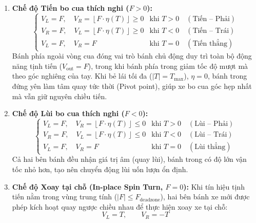 \begin{enumerate}
    \item \textbf{Chế độ Tiến bo cua thích nghi ($F > 0$):}
    \begin{equation}
    \begin{cases}
    V_L = F, \quad V_R = \left\lfloor F \cdot \eta(T) \right\rfloor \ge 0 & \text{khi } T > 0 \quad (\text{Tiến -- Phải}) \\[2mm]
    V_R = F, \quad V_L = \left\lfloor F \cdot \eta(T) \right\rfloor \ge 0 & \text{khi } T < 0 \quad (\text{Tiến -- Trái}) \\[2mm]
    V_L = F, \quad V_R = F & \text{khi } T = 0 \quad (\text{Tiến thẳng})
    \end{cases}
    \label{eq:forward_curv}
    \end{equation}
    Bánh phía ngoài vòng cua đóng vai trò bánh chủ động duy trì toàn bộ động năng tịnh tiến ($V_{\mathrm{out}} = F$), trong khi bánh phía trong giảm tốc độ mượt mà theo góc nghiêng của tay. Khi bẻ lái tối đa ($|T| = T_{\max}$), $\eta = 0$, bánh trong đứng yên làm tâm quay tức thời (Pivot point), giúp xe bo cua góc hẹp nhất mà vẫn giữ nguyên chiều tiến.

    \item \textbf{Chế độ Lùi bo cua thích nghi ($F < 0$):}
    \begin{equation}
    \begin{cases}
    V_L = F, \quad V_R = \left\lfloor F \cdot \eta(T) \right\rfloor \le 0 & \text{khi } T > 0 \quad (\text{Lùi -- Phải}) \\[2mm]
    V_R = F, \quad V_L = \left\lfloor F \cdot \eta(T) \right\rfloor \le 0 & \text{khi } T < 0 \quad (\text{Lùi -- Trái}) \\[2mm]
    V_L = F, \quad V_R = F & \text{khi } T = 0 \quad (\text{Lùi thẳng})
    \end{cases}
    \label{eq:backward_curv}
    \end{equation}
    Cả hai bên bánh đều nhận giá trị âm (quay lùi), bánh trong có độ lớn vận tốc nhỏ hơn, tạo nên chuyển động lùi uốn lượn ổn định.

    \item \textbf{Chế độ Xoay tại chỗ (In-place Spin Turn, $F = 0$):}
    Khi tín hiệu tịnh tiến nằm trong vùng trung tính ($|F| \le F_{\mathrm{deadzone}}$), hai bên bánh xe mới được phép kích hoạt quay ngược chiều nhau để thực hiện xoay xe tại chỗ:
    \begin{equation}
    V_L = T, \qquad V_R = -T
    \label{eq:spin_turn}
    \end{equation}
\end{enumerate}


